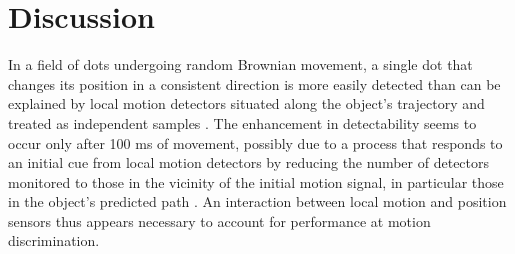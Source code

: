 \documentclass[manuscript]{subfiles}
\begin{document}
\section{Discussion}


 In a field of dots undergoing random Brownian movement, a single dot that changes its position in a consistent direction is more easily detected than can be explained by local motion detectors situated along the object's trajectory and treated as independent samples \citep{Verghese:1999lq}. The enhancement in detectability seems to occur only after 100 ms of movement, possibly due to a process that responds to an initial cue from local motion detectors by reducing the number of detectors monitored to those in the vicinity of the initial motion signal, in particular those in the object's predicted path \citep{VerghesePreeti2002}. An interaction between local motion and position sensors thus appears necessary to account for performance at motion discrimination. 


 
\end{document}
